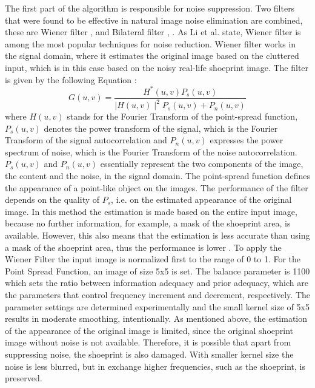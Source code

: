 \documentclass[draft,final]{vutinfth} %
\begin{document}
\par
The first part of the algorithm is responsible for noise suppression.
Two filters that were found to be effective in natural image noise elimination are combined, these are Wiener filter \cite{li2014rapid}, \cite{chatterjee2011patch} and Bilateral filter \cite{zhang2016simultaneous}, \cite{huang2013self}.
As Li et al. \cite{li2014rapid} state, Wiener filter is among the most popular techniques for noise reduction.
Wiener filter works in the signal domain, where it estimates the original image based on the cluttered input, which is in this case based on the noisy real-life shoeprint image. 
The filter is given by the following Equation \cite{Win}:
\begin{equation}
G(u, v) = \frac{H^*(u,v) P_s(u, v)}{\mid H(u,v)\mid ^2 P_s (u, v) + P_n (u, v)}  
\end{equation}
where $H(u,v)$ stands for the Fourier Transform of the point-spread function, $P_s (u,v)$ denotes the power transform of the signal, which is the Fourier Transform of the signal autocorrelation and $P_n(u,v)$ expresses the power spectrum of noise, which is the Fourier Transform of the noise autocorrelation.
 $P_s(u,v)$ and  $P_n(u,v)$ essentially represent the two components of the image, the content and the noise, in the signal domain.
The point-spread function defines the appearance of a point-like object on the images.
The performance of the filter depends on the quality of $P_s$, i.e. on the estimated appearance of the original image.
In this method the estimation is made based on the entire input image, because no further information, for example, a mask of the shoeprint  area, is available.
However, this also means that the estimation is less accurate than using a mask of the shoeprint area, thus the performance is lower \cite{chatterjee2011patch}.
To apply the Wiener Filter the input image is normalized first to the range of 0 to 1.
For the Point Spread Function, an image of size 5x5 is set.
The balance parameter is 1100 which sets the ratio between information adequacy and prior adequacy, which are the parameters that control frequency increment and decrement, respectively. 
The parameter settings are determined experimentally and the small kernel size of 5x5 results in moderate smoothing, intentionally.
As mentioned above, the estimation of the appearance of the original image is limited, since the original shoeprint image without noise is not available.
Therefore, it is possible that apart from suppressing noise, the shoeprint is also damaged.
With smaller kernel size the noise is less blurred, but in exchange higher frequencies, such as the shoeprint, is preserved.
\end{document}
